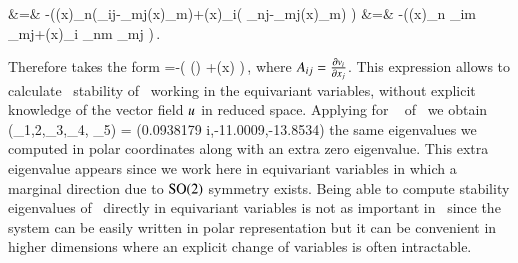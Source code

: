			&=& -\left(\groupTan(x)_n\left(\Lg_{ij}-\Lg_{mj}\groupTan(x)_m\right)+\groupTan(x)_i\left( \Lg_{nj}-\Lg_{mj}\groupTan(x)_m\right) \right)\continue
			&=& -\left(\groupTan(x)_n \Pperp_{im} \Lg_{mj}+\groupTan(x)_i \Pperp_{nm} \Lg_{mj} \right)\,.
\eea

Therefore  takes the form
\beq
	\mathbf{\bar{\Mvar}}=\PperpOp {}-\left(  \left(\PperpOp \Lg\right) +\groupTan(x) \otimes {} \right)\,,
	\label{eq:reqvStab}
\eeq
where $A_{ij}=\frac{\partial v_i}{\partial x_j}$. This
expression allows to calculate \reducedsp\ stability of \reqva\ working
in the equivariant variables, without explicit knowledge of
the vector field  $u$ in reduced space. Applying
 for \reqv\  of \cLe\ we obtain
\beq
(\eigExp_{1,2},\eigExp_3,\eigExp_4, \eigExp_5)
= (0.0938179  i,-11.0009,-13.8534)
\eeq
the same eigenvalues  we computed in
polar coordinates along with an extra zero eigenvalue. This extra
eigenvalue appears since we work here in equivariant variables
in which a marginal direction due to $\textrm{SO}(2)$ symmetry exists. Being
able to compute stability eigenvalues of \reqva\ directly in
equivariant variables is not as important in \cLe\ since the
system can be easily written in polar representation 
but it can be convenient in higher dimensions where an
explicit change of variables is often intractable.
